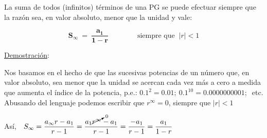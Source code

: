 \begin{theorem}

La suma de todos (infinitos) términos de una PG se puede efectuar siempre que la razón sea, en valor absoluto, menor que la unidad y vale:

$$\boldsymbol{ S_\infty \ = \ \dfrac{a_1}{1-r} } \qquad \qquad \text{siempre que } \ |r|<1$$
	
\end{theorem}


\underline{Demostración}:

Nos basamos en el hecho de que las sucesivas potencias de un número que, en valor absoluto, sea menor que la unidad se acercan cada vez más a cero a medida que aumenta el índice de la potencia, p.e.: $0.1^2=0.01;\ 0.1^{10}=0.0000000001;\ $ etc. Abusando del lenguaje podemos escribir que $r^\infty =0$, siempre que $|r|<1$

Así, $\ \ S_\infty=\dfrac{a_{\infty}r-a_1}{r-1}=\dfrac{a_1\cancelto{0}{r^\infty}-a_1}{r-1}=\dfrac{-a_1}{r-1}=\dfrac{a_1}{1-r}$ \QED

